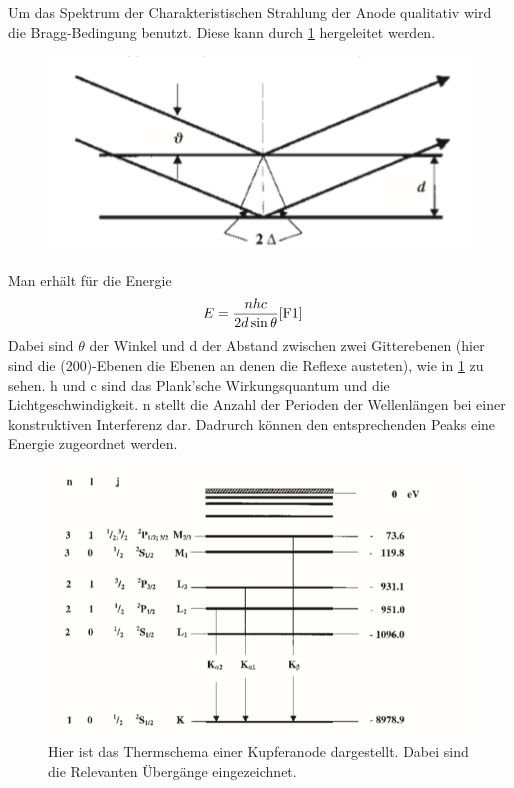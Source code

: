 \documentclass[
	a4paper,
	12pt,
	pagesize,
	ngerman
]{scrartcl}
\begin{document}
Um das Spektrum der Charakteristischen Strahlung der Anode qualitativ wird die Bragg-Bedingung benutzt. Diese kann durch \cref{B2} hergeleitet werden.
\begin{figure}[h!]
    \centering
    \includegraphics[scale = 1.5]{bragg.png}
    \caption{}
    \label{B2}
\end{figure}
Man erhält für die Energie 
\begin{align}
    E &= \frac{nhc}{2d\sin{\theta}} \cref{F1}
\end{align}
Dabei sind $\theta$ der Winkel und d der Abstand zwischen zwei Gitterebenen (hier sind die (200)-Ebenen die Ebenen an denen die Reflexe austeten), wie in \cref{B2} zu sehen. h und c sind das Plank'sche Wirkungsquantum und die Lichtgeschwindigkeit. n stellt die Anzahl der Perioden der Wellenlängen bei einer konstruktiven Interferenz dar.
Dadrurch können den entsprechenden Peaks eine Energie zugeordnet werden.
\begin{figure}[h!]
    \centering
    \includegraphics[scale = 1]{termschema.png}
    \caption{Hier ist das Thermschema einer Kupferanode dargestellt. Dabei sind die Relevanten Übergänge eingezeichnet.}
    \label{B3}
\end{figure}
\end{document}
